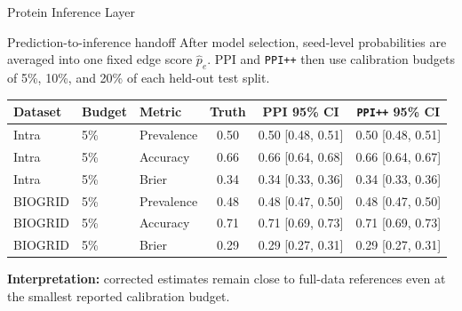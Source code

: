 \documentclass[aspectratio=169,10pt]{beamer}
\newcommand{\PPIPP}{\texttt{PPI++}}
\begin{document}
\begin{frame}{Protein Inference Layer}
\begin{block}{Prediction-to-inference handoff}
After model selection, seed-level probabilities are averaged into one fixed edge score \(\hat p_e\). PPI and \PPIPP{} then use calibration budgets of 5\%, 10\%, and 20\% of each held-out test split.
\end{block}

\vspace{0.1cm}
\begin{center}
\scriptsize
\begin{tabular}{lllccc}
\toprule
Dataset & Budget & Metric & Truth & PPI 95\% CI & \PPIPP{} 95\% CI\\
\midrule
Intra & 5\% & Prevalence & 0.50 & 0.50 [0.48, 0.51] & 0.50 [0.48, 0.51]\\
Intra & 5\% & Accuracy & 0.66 & 0.66 [0.64, 0.68] & 0.66 [0.64, 0.67]\\
Intra & 5\% & Brier & 0.34 & 0.34 [0.33, 0.36] & 0.34 [0.33, 0.36]\\
BIOGRID & 5\% & Prevalence & 0.48 & 0.48 [0.47, 0.50] & 0.48 [0.47, 0.50]\\
BIOGRID & 5\% & Accuracy & 0.71 & 0.71 [0.69, 0.73] & 0.71 [0.69, 0.73]\\
BIOGRID & 5\% & Brier & 0.29 & 0.29 [0.27, 0.31] & 0.29 [0.27, 0.31]\\
\bottomrule
\end{tabular}
\end{center}

\textbf{Interpretation:} corrected estimates remain close to full-data references even at the smallest reported calibration budget.
\end{frame}
\end{document}
